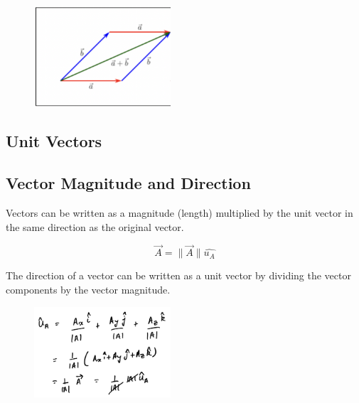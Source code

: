 \begin{figure}[!h]
\centering
\includegraphics[angle=0, width=2in]{VectorsScalarsFigures/VecAddition.png}
\vspace{-2mm}
\caption{\small {}}
\vspace{-3mm}
\label{Fig:NewtonsLaws}
\end{figure}

\subsection{Unit Vectors}


\subsection{Vector Magnitude and Direction}

Vectors can be written as a magnitude (length) multiplied by the unit vector in the same direction as the original vector. 

\[\vec{A} = \|\vec{A}\|  \hat{u_A}\]


The direction of a vector can be written as a unit vector by dividing the vector components by the vector magnitude. 

\begin{figure}[!h]
\centering
\includegraphics[angle=0, width=2in]{VectorsScalarsFigures/UnitVec.png}
\vspace{-2mm}
\caption{\small {}}
\vspace{-3mm}
\label{Fig:NewtonsLaws}
\end{figure}

